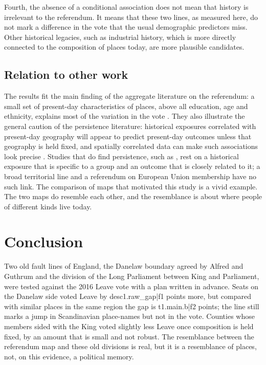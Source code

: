 \documentclass[11pt,a4paper]{article}
\begin{document}
Fourth, the absence of a conditional association does not mean that history is irrelevant to the referendum. It means that these two lines, as measured here, do not mark a difference in the vote that the usual demographic predictors miss. Other historical legacies, such as industrial history, which is more directly connected to the composition of places today, are more plausible candidates.

\subsection{Relation to other work}
The results fit the main finding of the aggregate literature on the referendum: a small set of present-day characteristics of places, above all education, age and ethnicity, explains most of the variation in the vote \citep{becker2017,goodwin2016,alabrese2019}. They also illustrate the general caution of the persistence literature: historical exposures correlated with present-day geography will appear to predict present-day outcomes unless that geography is held fixed, and spatially correlated data can make such associations look precise \citep{conley1999}. Studies that do find persistence, such as \citet{voigtlaender2012}, rest on a historical exposure that is specific to a group and an outcome that is closely related to it; a broad territorial line and a referendum on European Union membership have no such link. The comparison of maps that motivated this study is a vivid example. The two maps do resemble each other, and the resemblance is about where people of different kinds live today.

\section{Conclusion}
Two old fault lines of England, the Danelaw boundary agreed by Alfred and Guthrum and the division of the Long Parliament between King and Parliament, were tested against the 2016 Leave vote with a plan written in advance. Seats on the Danelaw side voted Leave by {{desc1.raw_gap|f1}} points more, but compared with similar places in the same region the gap is {{t1.main.b|f2}} points; the line still marks a jump in Scandinavian place-names but not in the vote. Counties whose members sided with the King voted slightly less Leave once composition is held fixed, by an amount that is small and not robust. The resemblance between the referendum map and these old divisions is real, but it is a resemblance of places, not, on this evidence, a political memory.
\end{document}
